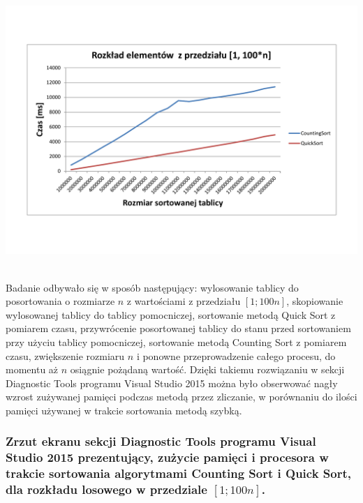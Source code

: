 \documentclass[polish,polish,a4paper]{article}
\begin{document}
\begin{spacing}{1.5}
\begin{minipage}[H]{\textwidth}
	\begin{center}
		\includegraphics[scale=0.6]{zad4100n.pdf}
		\label{fig:zad4100n}
	\end{center}
\end{minipage}\\

Badanie odbywało się w sposób następujący: wylosowanie tablicy do posortowania o rozmiarze $n$ z wartościami z przedziału $[1;100n]$, skopiowanie wylosowanej tablicy do tablicy pomocniczej, sortowanie metodą Quick Sort z pomiarem czasu, przywrócenie posortowanej tablicy do stanu przed sortowaniem przy użyciu tablicy pomocniczej, sortowanie metodą Counting Sort z pomiarem czasu, zwiększenie rozmiaru $n$ i ponowne przeprowadzenie całego procesu, do momentu aż $n$ osiągnie pożądaną wartość.	Dzięki takiemu rozwiązaniu w sekcji Diagnostic Tools programu Visual Studio 2015 można było obserwować nagły wzrost zużywanej pamięci podczas metodą przez zliczanie, w porównaniu do ilości pamięci używanej w trakcie sortowania metodą szybką. 

\subsubsection*{Zrzut ekranu sekcji Diagnostic Tools programu Visual Studio 2015 prezentujący, zużycie pamięci i procesora w trakcie sortowania algorytmami Counting Sort i  Quick Sort, dla rozkładu losowego w przedziale $[1;100n]$.}


\end{spacing}
\end{document}
